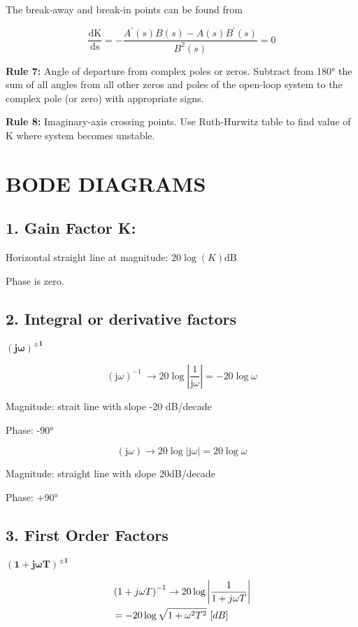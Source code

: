 \begin{multicols}{3}
The break-away and break-in points can be found from

\[\frac{\text{dK}}{\text{ds}} = - \frac{A^{'}\left( s \right)B\left( s \right) - A\left( s \right)B^{'}\left( s \right)}{B^{2}\left( s \right)} = 0\]

\textbf{Rule 7:} Angle of departure from complex poles or zeros.
Subtract from 180° the sum of all angles from all other zeros and poles
of the open-loop system to the complex pole (or zero) with appropriate
signs.

\textbf{Rule 8:} Imaginary-axis crossing points. Use Ruth-Hurwitz table
to find value of K where system becomes unstable.

\section{BODE DIAGRAMS}


\subsection{1. Gain Factor K:} Horizontal straight line at magnitude:
\(20\log{(K)}\text{dB}\)

Phase is zero.

\subsection{2. Integral or derivative factors}
\(\mathbf{(j\omega)}^{\mathbf{\pm 1}}\)

\[\left( \text{j}\omega \right)^{- 1}\  \rightarrow 20\log{\left| \frac{1}{\text{j}\omega} \right| = - 20\log\omega}\]

Magnitude: strait line with slope -20 dB/decade

Phase: -90°

\[\left( \text{j}\omega \right) \rightarrow 20\log\left| \text{j}\omega \right| = 20\log\omega\]

Magnitude: straight line with slope 20dB/decade

Phase: +90°

\subsection{3. First Order Factors}
\(\left( \mathbf{1 + j\omega T} \right)^{\mathbf{\pm 1}}\)

\begin{align}
& \left( 1 + j\omega T \right)^{- 1} \rightarrow 20\log\left| \frac{1}{1 + j\omega T} \right| \\ \notag
&= - 20\log\sqrt{1 + \omega^{2}T^{2}}\ \lbrack dB\rbrack
\end{align}


\end{multicols}
